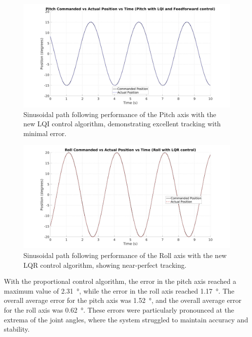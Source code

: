 \begin{figure}[H]
    \centering
    \includegraphics[width=1.00\linewidth]{figures/pitch_lqi_sin.jpg}
    \caption{Sinusoidal path following performance of the Pitch axis with the new LQI control algorithm, demonstrating excellent tracking with minimal error.}
    \label{fig:pitch_lqi_sin}
\end{figure}

\begin{figure}[H]
    \centering
    \includegraphics[width=1.00\linewidth]{figures/roll_lqr_sin.jpg}
    \caption{Sinusoidal path following performance of the Roll axis with the new LQR control algorithm, showing near-perfect tracking.}
    \label{fig:roll_lqr_sin}
\end{figure}

With the proportional control algorithm, the error in the pitch axis reached a maximum value of \SI{2.31}{\degree}, while the error in the roll axis reached \SI{1.17}{\degree}. The overall average error for the pitch axis was \SI{1.52}{\degree}, and the overall average error for the roll axis was \SI{0.62}{\degree}. These errors were particularly pronounced at the extrema of the joint angles, where the system struggled to maintain accuracy and stability.

